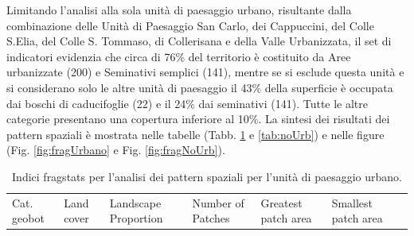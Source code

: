 \documentclass[
  a4paper,
]{book}
\begin{document}
Limitando l'analisi alla sola unità di paesaggio urbano, risultante dalla combinazione delle Unità di Paesaggio San Carlo, dei Cappuccini, del Colle S.Elia, del Colle S. Tommaso, di Collerisana e della Valle Urbanizzata, il set di indicatori evidenzia che circa di 76\% del territorio è costituito da Aree urbanizzate (200) e Seminativi semplici (141), mentre se si esclude questa unità e si considerano solo le altre unità di paesaggio il 43\% della superficie è occupata dai boschi di caducifoglie (22) e il 24\% dai seminativi (141).
Tutte le altre categorie presentano una copertura inferiore al 10\%.
La sintesi dei risultati dei pattern spaziali è mostrata nelle tabelle (Tabb. \ref{tab:fragUrbano} e \ref{tab:noUrb}) e nelle figure (Fig. \ref{fig:fragUrbano} e Fig.
\ref{fig:fragNoUrb}).

\begin{longtable}[]{@{}
  >{\raggedright\arraybackslash}p{}
  >{\raggedright\arraybackslash}p{}
  >{\centering\arraybackslash}p{}
  >{\raggedright\arraybackslash}p{}
  >{\raggedright\arraybackslash}p{}
  >{\raggedright\arraybackslash}p{}
  >{\raggedright\arraybackslash}p{}@{}}
\caption{\label{tab:fragUrbano} Indici fragstats per l'analisi dei pattern spaziali per l'unità di paesaggio urbano.}\tabularnewline
\toprule\noalign{}
\begin{minipage}[b]{\linewidth}\raggedright
Cat. geobot
\end{minipage} & \begin{minipage}[b]{\linewidth}\raggedright
Land cover
\end{minipage} & \begin{minipage}[b]{\linewidth}\centering
Landscape Proportion
\end{minipage} & \begin{minipage}[b]{\linewidth}\raggedright
Number of Patches
\end{minipage} & \begin{minipage}[b]{\linewidth}\raggedright
Greatest patch area
\end{minipage} & \begin{minipage}[b]{\linewidth}\raggedright
Smallest patch area
\end{minipage} & \begin{minipage}[b]{\linewidth}\raggedright

\end{minipage}
\end{longtable}
\end{document}

